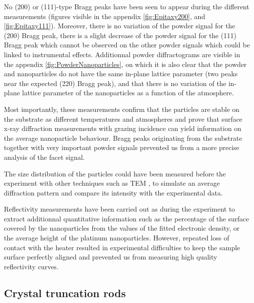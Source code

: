 No (200) or (111)-type Bragg peaks have been seen to appear during the different measurements (figures visible in the appendix \ref{fig:Epitaxy200}, and \ref{fig:Epitaxy111}).
Moreover, there is no variation of the powder signal for the (200) Bragg peak, there is a slight decrease of the powder signal for the (111) Bragg peak which cannot be observed on the other powder signals which could be linked to instrumental effects.
Additionnal powder diffractograms are visible in the appendix \ref{fig:PowderNanoparticles}, on which it is also clear that the powder and nanoparticles do not have the same in-plane lattice parameter (two peaks near the expected (220) Bragg peak), and that there is no variation of the in-plane lattice parameter of the nanoparticles as a function of the atmosphere.

Most importantly, these measurements confirm that the particles are stable on the substrate as different temperatures and atmospheres and prove that surface x-ray diffraction measurements with grazing incidence can yield information on the average nanoparticle behaviour.
Bragg peaks originating from the  substrate together with very important powder signals prevented us from a more precise analysis of the facet signal.

The size distribution of the particles could have been measured before the experiment with other techniques such as TEM \parencite{Hejral2013}, to simulate an average diffraction pattern and compare its intensity with the experimental data.

Reflectivity measurements have been carried out as during the experiment to extract additionnal quantitative information such as the percentage of the surface covered by the nanoparticles from the values of the fitted electronic density, or the average height of the platinum nanoparticles.
However, repeated loss of contact with the heater resulted in experimental difficulties to keep the sample surface perfectly aligned and prevented us from measuring high quality reflectivity curves.

\subsection{Crystal truncation rods}

